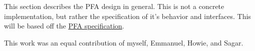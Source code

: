 This section describes the PFA design in general. This is not a concrete implementation, but rather the specification of it's behavior and interfaces. This will be based off the \href{https://github.com/WabashOS/riscv-isa-sim/blob/pfa/pfa_spec.md}{PFA specification}.

This work was an equal contribution of myself, Emmanuel, Howie, and Sagar.